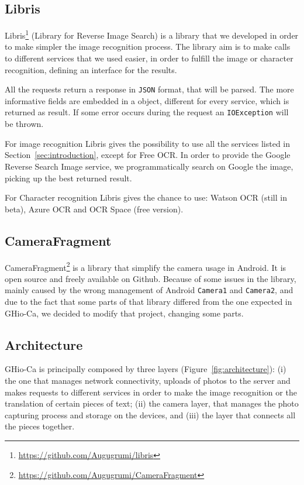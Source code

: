 \subsection{Libris}
Libris\footnote{\url{https://github.com/Augugrumi/libris}} (Library for Reverse
Image Search) is a library that we developed in order to make 
simpler the image recognition process. The library aim is to make calls to 
different services that we used easier, in order to fulfill the image or 
character recognition, defining an interface for the results.

All the requests return a response in \texttt{JSON} format, that will be parsed.
The more informative fields are embedded in a object, different for every
service, which is returned as result. If some error occurs during the request an
\texttt{IOException} will be thrown.

For image recognition Libris gives the possibility to use all the services
listed in Section~\ref{sec:introduction}, except for Free OCR. In order to
provide the Google Reverse Search Image service, we programmatically search on
Google the image, picking up the best returned result.

For Character recognition Libris gives the chance to use: Watson OCR (still in
beta), Azure OCR and OCR Space (free version).

\subsection{CameraFragment}
CameraFragment\footnote{\url{https://github.com/Augugrumi/CameraFragment}} is a
library that simplify the camera usage in Android. It is
open source and freely available on Github. Because of some issues in the
library, mainly caused by the wrong management of Android \texttt{Camera1} and
\texttt{Camera2}, and due to the fact that some parts of that library differed
from the one expected in GHio-Ca, we decided to modify that project, changing
some parts.

\subsection{Architecture}
GHio-Ca is principally composed by three layers (Figure~\ref{fig:architecture}):
(i) the one that manages network connectivity, uploads of photos to the server
and makes requests to different services in order to make the image recognition
or the translation of certain pieces of text; (ii) the camera layer, that
manages the photo capturing process and storage on the devices, and (iii) the
layer that
connects all the pieces together.

